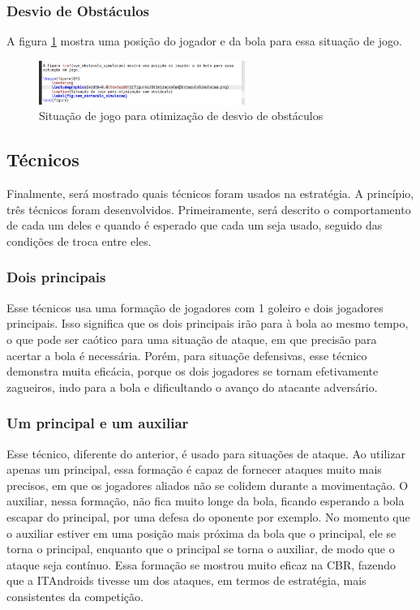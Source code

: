 \documentclass[a4paper,12pt]{article}
\begin{document}
\subsubsection{Desvio de Obstáculos}



A figura \ref{fig:com_obstaculo_simulacao} mostra uma posição do jogador e da bola para essa situação de jogo.

\begin{figure}[H]
	\centering
	\includegraphics[width=0.6\textwidth]{figures/OtimizacaoComObstaculoSimulacao.png}
	\caption{Situação de jogo para otimização de desvio de obstáculos}
	\label{fig:com_obstaculo_simulacao}
\end{figure}


\subsection{Técnicos}

Finalmente, será mostrado quais técnicos foram usados na estratégia. A princípio, três técnicos foram desenvolvidos. Primeiramente, será descrito o comportamento de cada um deles e quando é esperado que cada um seja usado, seguido das condições de troca entre eles.



\subsubsection{Dois principais} Esse técnicos usa uma formação de jogadores com 1 goleiro e dois jogadores principais. Isso significa que os dois principais irão para à bola ao mesmo tempo, o que pode ser caótico para uma situação de ataque, em que precisão para acertar a bola é necessária. Porém, para situaçõe defensivas, esse técnico demonstra muita eficácia, porque os dois jogadores se tornam efetivamente zagueiros, indo para a bola e dificultando o avanço do atacante adversário.

\subsubsection{Um principal e um auxiliar} Esse técnico, diferente do anterior, é usado para situações de ataque. Ao utilizar apenas um principal, essa formação é capaz de fornecer ataques muito mais precisos, em que os jogadores aliados não se colidem durante a movimentação. O auxiliar, nessa formação, não fica muito longe da bola, ficando esperando a bola escapar do principal, por uma defesa do oponente por exemplo. No momento que o auxiliar estiver em uma posição mais próxima da bola que o principal, ele se torna o principal, enquanto que o principal se torna o auxiliar, de modo que o ataque seja contínuo. Essa formação se mostrou muito eficaz na CBR, fazendo que a ITAndroids tivesse um dos ataques, em termos de estratégia, mais consistentes da competição.
\end{document}
